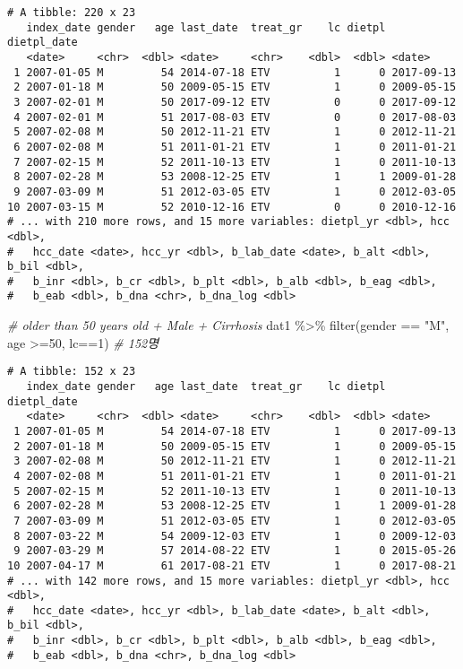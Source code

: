 \documentclass[
]{article}
\newenvironment{Shaded}{\begin{snugshade}}{\end{snugshade}}
\newcommand{\CommentTok}[1]{\textcolor[rgb]{0.56,0.35,0.01}{\textit{#1}}}
\newcommand{\DecValTok}[1]{\textcolor[rgb]{0.00,0.00,0.81}{#1}}
\newcommand{\FunctionTok}[1]{\textcolor[rgb]{0.00,0.00,0.00}{#1}}
\newcommand{\NormalTok}[1]{#1}
\newcommand{\SpecialCharTok}[1]{\textcolor[rgb]{0.00,0.00,0.00}{#1}}
\newcommand{\StringTok}[1]{\textcolor[rgb]{0.31,0.60,0.02}{#1}}
\begin{document}
\begin{verbatim}
# A tibble: 220 x 23
   index_date gender   age last_date  treat_gr    lc dietpl dietpl_date
   <date>     <chr>  <dbl> <date>     <chr>    <dbl>  <dbl> <date>     
 1 2007-01-05 M         54 2014-07-18 ETV          1      0 2017-09-13 
 2 2007-01-18 M         50 2009-05-15 ETV          1      0 2009-05-15 
 3 2007-02-01 M         50 2017-09-12 ETV          0      0 2017-09-12 
 4 2007-02-01 M         51 2017-08-03 ETV          0      0 2017-08-03 
 5 2007-02-08 M         50 2012-11-21 ETV          1      0 2012-11-21 
 6 2007-02-08 M         51 2011-01-21 ETV          1      0 2011-01-21 
 7 2007-02-15 M         52 2011-10-13 ETV          1      0 2011-10-13 
 8 2007-02-28 M         53 2008-12-25 ETV          1      1 2009-01-28 
 9 2007-03-09 M         51 2012-03-05 ETV          1      0 2012-03-05 
10 2007-03-15 M         52 2010-12-16 ETV          0      0 2010-12-16 
# ... with 210 more rows, and 15 more variables: dietpl_yr <dbl>, hcc <dbl>,
#   hcc_date <date>, hcc_yr <dbl>, b_lab_date <date>, b_alt <dbl>, b_bil <dbl>,
#   b_inr <dbl>, b_cr <dbl>, b_plt <dbl>, b_alb <dbl>, b_eag <dbl>,
#   b_eab <dbl>, b_dna <chr>, b_dna_log <dbl>
\end{verbatim}

\begin{Shaded}
\begin{Highlighting}[]
\CommentTok{\# older than 50 years old + Male + Cirrhosis}
\NormalTok{dat1 }\SpecialCharTok{\%\textgreater{}\%} 
  \FunctionTok{filter}\NormalTok{(gender }\SpecialCharTok{==} \StringTok{"M"}\NormalTok{, age }\SpecialCharTok{\textgreater{}=}\DecValTok{50}\NormalTok{, lc}\SpecialCharTok{==}\DecValTok{1}\NormalTok{) }\CommentTok{\# 152명}
\end{Highlighting}
\end{Shaded}

\begin{verbatim}
# A tibble: 152 x 23
   index_date gender   age last_date  treat_gr    lc dietpl dietpl_date
   <date>     <chr>  <dbl> <date>     <chr>    <dbl>  <dbl> <date>     
 1 2007-01-05 M         54 2014-07-18 ETV          1      0 2017-09-13 
 2 2007-01-18 M         50 2009-05-15 ETV          1      0 2009-05-15 
 3 2007-02-08 M         50 2012-11-21 ETV          1      0 2012-11-21 
 4 2007-02-08 M         51 2011-01-21 ETV          1      0 2011-01-21 
 5 2007-02-15 M         52 2011-10-13 ETV          1      0 2011-10-13 
 6 2007-02-28 M         53 2008-12-25 ETV          1      1 2009-01-28 
 7 2007-03-09 M         51 2012-03-05 ETV          1      0 2012-03-05 
 8 2007-03-22 M         54 2009-12-03 ETV          1      0 2009-12-03 
 9 2007-03-29 M         57 2014-08-22 ETV          1      0 2015-05-26 
10 2007-04-17 M         61 2017-08-21 ETV          1      0 2017-08-21 
# ... with 142 more rows, and 15 more variables: dietpl_yr <dbl>, hcc <dbl>,
#   hcc_date <date>, hcc_yr <dbl>, b_lab_date <date>, b_alt <dbl>, b_bil <dbl>,
#   b_inr <dbl>, b_cr <dbl>, b_plt <dbl>, b_alb <dbl>, b_eag <dbl>,
#   b_eab <dbl>, b_dna <chr>, b_dna_log <dbl>
\end{verbatim}
\end{document}
